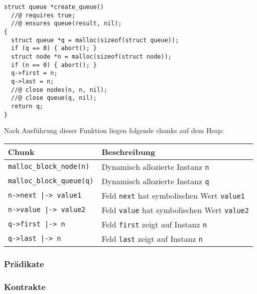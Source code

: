 \begin{lstlisting}
struct queue *create_queue()
  //@ requires true;
  //@ ensures queue(result, nil);
{
  struct queue *q = malloc(sizeof(struct queue));
  if (q == 0) { abort(); }
  struct node *n = malloc(sizeof(struct node));
  if (n == 0) { abort(); }
  q->first = n;
  q->last = n;
  //@ close nodes(n, n, nil);
  //@ close queue(q, nil);
  return q;
}
\end{lstlisting}

\noindent
Nach Ausführung dieser Funktion liegen folgende chunks auf dem Heap:

{\setlength\extrarowheight{5pt} %
\begin{table}[hbt!]
	\centering
	\begin{tabular}{|l|l|}
		\hline
		\rowcolor[HTML]{EFEFEF}
		\textbf{Chunk}                   & \textbf{Beschreibung}                                     \\ \hline
		\texttt{malloc\_block\_node(n)}  & Dynamisch allozierte Instanz \texttt{n}                   \\ \hline
		\texttt{malloc\_block\_queue(q)} & Dynamisch allozierte Instanz \texttt{q}                   \\ \hline
		\texttt{n->next |-> value1}      & Feld \texttt{next} hat symbolischen Wert \texttt{value1}  \\ \hline
		\texttt{n->value |-> value2}     & Feld \texttt{value} hat symbolischen Wert \texttt{value2} \\ \hline
		\texttt{q->first |-> n}          & Feld \texttt{first} zeigt auf Instanz \texttt{n}          \\ \hline
		\texttt{q->last |-> n}           & Feld \texttt{last} zeigt auf Instanz \texttt{n}           \\ \hline
	\end{tabular}
\end{table}
}

\subsubsection{Prädikate}

\subsubsection{Kontrakte}

